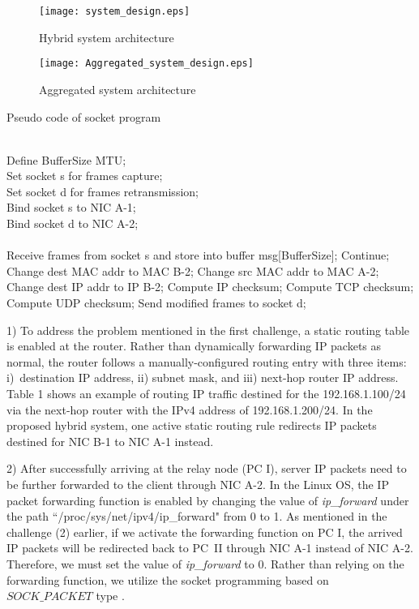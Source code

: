 \documentclass[10pt,journal]{IEEEtran}
\begin{document}
\begin{figure}
\centering
\texttt{[image: system\_design.eps]}
\caption{Hybrid system architecture}
\label{fig_system_design}
\end{figure}

\begin{figure}
\centering
\texttt{[image: Aggregated\_system\_design.eps]}
\caption{Aggregated system architecture}
\label{fig_Aggregated_system_design}
\end{figure}

\begin{algorithm}
\caption{Pseudo code of socket program}\label{algorithm}
\begin{algorithmic}[1]
\REQUIRE~~\\
Define BufferSize MTU;\\
Set socket s for frames capture;\\
Set socket d for frames retransmission;\\
Bind socket s to NIC A-1;\\
Bind socket d to NIC A-2;\\
\ENSURE~~\\
\STATE Receive frames from socket s and store into buffer msg[BufferSize];
\STATE Continue;
\ENDIF
{}
\STATE Change dest MAC addr to MAC B-2;
\STATE Change src MAC addr to MAC A-2;
\STATE Change dest IP addr to IP B-2;
\STATE Compute IP checksum;
\STATE Compute TCP checksum;
\STATE Compute UDP checksum;
\STATE Send modified frames to socket d;
\ENDIF
\ENDWHILE
\end{algorithmic}
\end{algorithm}

1) To address the problem mentioned in the first challenge, a static routing table is enabled at the router. Rather than dynamically forwarding IP packets as normal, the router follows a manually-configured routing entry with three items: i)~destination IP address, ii) subnet mask, and iii) next-hop router IP address. Table 1 shows an example of routing IP traffic destined for the 192.168.1.100/24 via the next-hop router with the IPv4 address of 192.168.1.200/24. In the proposed hybrid system, one active static routing rule redirects IP packets destined for NIC B-1 to NIC A-1 instead.

2) After successfully arriving at the relay node (PC I), server IP packets need to be further forwarded to the client through NIC A-2. In the Linux OS, the IP packet forwarding function is enabled by changing the value of {\em ip\_forward} under the path ``/proc/sys/net/ipv4/ip\_forward" from 0 to 1. As mentioned in the challenge (2) earlier, if we activate the forwarding function on PC I, the arrived IP packets will be redirected back to PC~II through NIC A-1 instead of NIC A-2. Therefore, we must set the value of {\em ip\_forward} to 0. Rather than relying on the forwarding function, we utilize the socket programming based on $SOCK\_PACKET$ type \cite{senie2002using}.
\end{document}
